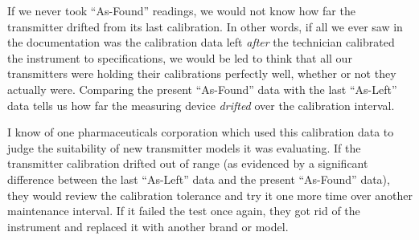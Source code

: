 If we never took ``As-Found'' readings, we would not know how far the transmitter drifted from its last calibration.  In other words, if all we ever saw in the documentation was the calibration data left {\it after} the technician calibrated the instrument to specifications, we would be led to think that all our transmitters were holding their calibrations perfectly well, whether or not they actually were.  Comparing the present ``As-Found'' data with the last ``As-Left'' data tells us how far the measuring device {\it drifted} over the calibration interval.

I know of one pharmaceuticals corporation which used this calibration data to judge the suitability of new transmitter models it was evaluating.  If the transmitter calibration drifted out of range (as evidenced by a significant difference between the last ``As-Left'' data and the present ``As-Found'' data), they would review the calibration tolerance and try it one more time over another maintenance interval.  If it failed the test once again, they got rid of the instrument and replaced it with another brand or model.




